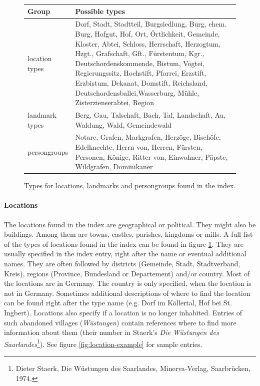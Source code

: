 \begin{figure}[h]
\begin{tabular}{|l|p{9cm}|}
\hline
\textbf{Group}        & \textbf{Possible types}  \\
\hline
location types & Dorf, Stadt, Stadtteil, Burgsiedlung, Burg,  ehem. Burg, Hofgut, Hof, Ort, Örtlichkeit, Gemeinde, Kloster,   Abtei, Schloss, Herrschaft, Herzogtum, Hzgt., Grafschaft,    Gft., Fürstentum, Kgr., Deutschordenskommende, Bistum,     Vogtei, Regierungssitz, Hochstift, Pfarrei, Erzstift, Erzbistum, Dekanat, Domstift, Reichsland, Deutschordensballei,Wasserburg, Mühle, Zisterzienserabtei, Region \\
\hline
landmark types & Berg, Gau, Talschaft, Bach, Tal, Landschaft, Au, Waldung, Wald, Gemeindewald \\
\hline
persongroups   & Notare, Grafen, Markgrafen, Herzöge, Bischöfe, Edelknechte, Herrn von, Herren, Fürsten, Personen, Könige, Ritter von, Einwohner, Päpste, Wildgrafen, Dominikaner \\

\hline
\end{tabular} 
\caption{Types for locations, landmarks and persongroups found in the index.}
\label{fig:location-list}
\end{figure}

\paragraph{Locations}
The locations found in the index are geographical or political. They might also be buildings. Among them are towns, castles, parishes, kingdoms or mills. A full list of the types of locations found in the index can be found in figure \ref{fig:location-list}. They are usually specified in the index entry, right after the name or eventual additional names. They are often followed by districts (Gemeinde, Stadt, Stadtverband, Kreis), regions (Province, Bundesland or Departement) and/or country. Most of the locations are in Germany. The country is only specified, when the location is not in Germany. Sometimes additional descriptions of where to find the location can be found right after the type name (e.g. Dorf im Köllertal, Hof bei St. Ingbert). Locations also specify if a location is no longer inhabited. Entries of such abandoned villages (\textit{Wüstungen}) contain references where to find more information about them (their number in Staerk's \textit{Die Wüstungen des Saarlandes}\footnote{Dieter Staerk, Die Wüstungen des Saarlandes, Minerva-Verlag, Saarbrücken, 1974.}). See figure \ref{fig:location-example} for sample entries.

